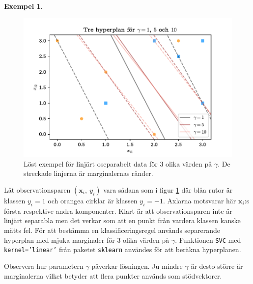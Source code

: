 \documentclass[a4paper, 12pt]{report}
\theoremstyle{definition}
\newtheorem{ex}{Exempel}[section]
\theoremstyle{remark}
\begin{document}
\begin{ex}
\begin{figure}[h]
	\centering
	\includegraphics[width=0.8\linewidth, trim={0.5cm 2mm 0.5cm 6mm}, clip]{KandFigur2.pdf}
	\caption{\label{fig:mjukamarginaler}Löst exempel för linjärt oseparabelt data för 3 olika värden på $\gamma$. De streckade linjerna är marginalernas ränder.}
\end{figure}
Låt observationsparen $\left(\mathbf{x}_i,~y_i\right)$ vara sådana som i figur \ref{fig:mjukamarginaler} där blåa rutor är klassen $y_i=1$ och orangea cirklar är klassen $y_i=-1$. Axlarna motsvarar här $\mathbf{x}_i$:s första respektive andra komponenter. Klart är att observationsparen inte är linjärt separabla men det verkar som att en punkt från vardera klassen kanske mätts fel. För att bestämma en klassificeringsregel används separerande hyperplan med mjuka marginaler för 3 olika värden på $\gamma$. Funktionen \texttt{SVC} med \texttt{kernel='linear'} från paketet \texttt{sklearn} \cite{sklearn} användes för att beräkna hyperplanen.

Observera hur parametern $\gamma$ påverkar lösningen. Ju mindre $\gamma$ är desto större är marginalerna vilket betyder att flera punkter används som stödvektorer.
\end{ex}
\end{document}
